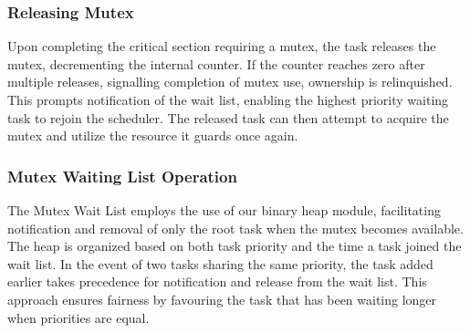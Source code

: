 \subsubsection{Releasing Mutex}
Upon completing the critical section requiring a mutex, the task releases the mutex, decrementing the internal counter. If the counter reaches zero after multiple releases, signalling completion of mutex use, ownership is relinquished. This prompts notification of the wait list, enabling the highest priority waiting task to rejoin the scheduler. The released task can then attempt to acquire the mutex and utilize the resource it guards once again.

\subsubsection{Mutex Waiting List Operation}
The Mutex Wait List employs the use of our binary heap module, facilitating notification and removal of only the root task when the mutex becomes available. The heap is organized based on both task priority and the time a task joined the wait list. In the event of two tasks sharing the same priority, the task added earlier takes precedence for notification and release from the wait list. This approach ensures fairness by favouring the task that has been waiting longer when priorities are equal.
